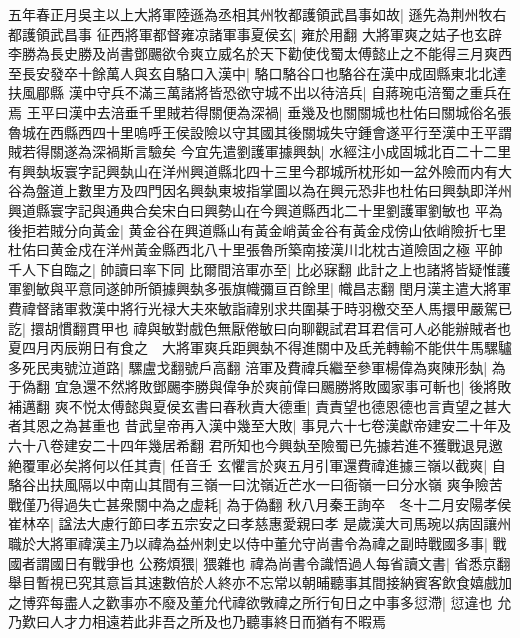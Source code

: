 五年春正月吳主以上大將軍陸遜為丞相其州牧都護領武昌事如故|{
	遜先為荆州牧右都護領武昌事}
征西將軍都督雍凉諸軍事夏侯玄|{
	雍於用翻}
大將軍爽之姑子也玄辟李勝為長史勝及尚書鄧颺欲令爽立威名於天下勸使伐蜀太傅懿止之不能得三月爽西至長安發卒十餘萬人與玄自駱口入漢中|{
	駱口駱谷口也駱谷在漢中成固縣東北北達扶風郿縣}
漢中守兵不滿三萬諸將皆恐欲守城不出以待涪兵|{
	自蔣琬屯涪蜀之重兵在焉}
王平曰漢中去涪垂千里賊若得關便為深禍|{
	垂幾及也關關城也杜佑曰關城俗名張魯城在西縣西四十里嗚呼王侯設險以守其國其後關城失守鍾會遂平行至漢中王平謂賊若得關遂為深禍斯言驗矣}
今宜先遣劉護軍據興埶|{
	水經注小成固城北百二十二里有興埶坂寰字記興埶山在洋州興道縣北四十三里今郡城所枕形如一盆外險而内有大谷為盤道上數里方及四門因名興埶東坡指掌圖以為在興元恐非也杜佑曰興埶即洋州興道縣寰字記與通典合矣宋白曰興勢山在今興道縣西北二十里劉護軍劉敏也}
平為後拒若賊分向黃金|{
	黄金谷在興道縣山有黃金峭黃金谷有黃金戍傍山依峭險折七里杜佑曰黄金戍在洋州黃金縣西北八十里張魯所築南接漢川北枕古道險固之極}
平帥千人下自臨之|{
	帥讀曰率下同}
比爾間涪軍亦至|{
	比必寐翻}
此計之上也諸將皆疑惟護軍劉敏與平意同遂帥所領據興埶多張旗幟彌亘百餘里|{
	幟昌志翻}
閏月漢主遣大將軍費禕督諸軍救漢中將行光禄大夫來敏詣禕别求共圍棊于時羽檄交至人馬擐甲嚴駕已訖|{
	擐胡慣翻貫甲也}
禕與敏對戲色無厭倦敏曰向聊觀試君耳君信可人必能辦賊者也　夏四月丙辰朔日有食之　大將軍爽兵距興埶不得進關中及氐羌轉輸不能供牛馬騾驢多死民夷號泣道路|{
	騾盧戈翻號戶高翻}
涪軍及費禕兵繼至參軍楊偉為爽陳形埶|{
	為于偽翻}
宜急還不然將敗鄧颺李勝與偉争於爽前偉曰颺勝將敗國家事可斬也|{
	後將敗補邁翻}
爽不悦太傅懿與夏侯玄書曰春秋責大德重|{
	責責望也德恩德也言責望之甚大者其恩之為甚重也}
昔武皇帝再入漢中幾至大敗|{
	事見六十七卷漢獻帝建安二十年及六十八卷建安二十四年幾居希翻}
君所知也今興埶至險蜀已先據若進不獲戰退見邀絶覆軍必矣將何以任其責|{
	任音壬}
玄懼言於爽五月引軍還費禕進據三嶺以截爽|{
	自駱谷出扶風隔以中南山其間有三嶺一曰沈嶺近芒水一曰衙嶺一曰分水嶺}
爽争險苦戰僅乃得過失亡甚衆關中為之虚耗|{
	為于偽翻}
秋八月秦王詢卒　冬十二月安陽孝侯崔林卒|{
	諡法大慮行節曰孝五宗安之曰孝慈惠愛親曰孝}
是歲漢大司馬琬以病固讓州職於大將軍禕漢主乃以禕為益州刺史以侍中董允守尚書令為禕之副時戰國多事|{
	戰國者謂國日有戰爭也}
公務煩猥|{
	猥雜也}
禕為尚書令識悟過人每省讀文書|{
	省悉京翻}
舉目暫視已究其意旨其速數倍於人終亦不忘常以朝晡聽事其間接納賓客飲食嬉戲加之博弈每盡人之歡事亦不廢及董允代禕欲斆禕之所行旬日之中事多愆滯|{
	愆違也}
允乃歎曰人才力相遠若此非吾之所及也乃聽事終日而猶有不暇焉

